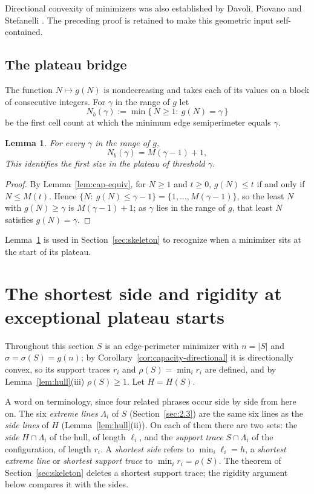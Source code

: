\documentclass[11pt]{article}
\theoremstyle{plain}
\newtheorem{lemma}[theorem]{Lemma}
\theoremstyle{definition}
\theoremstyle{remark}
\begin{document}
Directional convexity of minimizers was also established by
Davoli, Piovano and Stefanelli
\cite[Definition~3.2 and Proposition~3.3]{DavoliPiovanoStefanelli2017}.
The preceding proof is retained to make this geometric input
self-contained.

\subsection{The plateau bridge}\label{sec:2.7}

The function \(N\mapsto g(N)\) is nondecreasing and takes each of its values on a block of
consecutive integers. For \(\gamma\) in the range of \(g\) let
\[
   N_{b}(\gamma):=\min\{\,N\ge1:\ g(N)=\gamma\,\}
\]
be the first cell count at which the minimum edge semiperimeter equals \(\gamma\).

\begin{lemma}\label{lem:bridge}
For every \(\gamma\) in the range of \(g\),
\begin{equation}\label{eq:bridge}
   N_{b}(\gamma)=M(\gamma-1)+1 ,
\end{equation}
This identifies the first size in the plateau of threshold \(\gamma\).
\end{lemma}

\begin{proof}
By Lemma~\ref{lem:cap-equiv}, for \(N\ge1\) and \(t\ge0\), \(g(N)\le t\) if and only if \(N\le M(t)\). Hence
\(\{N:\ g(N)\le\gamma-1\}=\{1,\dots,M(\gamma-1)\}\), so the least \(N\) with
\(g(N)\ge\gamma\) is \(M(\gamma-1)+1\); as \(\gamma\) lies in the range of \(g\), that
least \(N\) satisfies \(g(N)=\gamma\).
\end{proof}

Lemma~\ref{lem:bridge} is used in Section~\ref{sec:skeleton} to recognize when a
minimizer sits at the start of its plateau.


\section{The shortest side and rigidity at exceptional plateau starts}\label{sec:rigidity}

Throughout this section \(S\) is an edge-perimeter minimizer with \(n=|S|\) and
\(\sigma=\sigma(S)=g(n)\); by Corollary~\ref{cor:capacity-directional} it is directionally convex, so
its support traces \(r_{i}\) and \(\rho(S)=\min_{i}r_{i}\) are defined, and by
Lemma~\ref{lem:hull}(iii) \(\rho(S)\ge1\). Let \(H=H(S)\).

A word on terminology, since four related phrases occur side by side from here on. The
six \emph{extreme lines} \(\Lambda_{i}\) of \(S\) (Section~\ref{sec:2.3}) are the same six
lines as the \emph{side lines} of \(H\) (Lemma~\ref{lem:hull}(ii)). On each of them there
are two sets: the \emph{side} \(H\cap\Lambda_{i}\) of the hull, of length \(\ell_{i}\), and the
\emph{support trace} \(S\cap\Lambda_{i}\) of the configuration, of length \(r_{i}\). A
\emph{shortest side} refers to \(\min_{i}\ell_{i}=h\), a \emph{shortest extreme line} or
\emph{shortest support trace} to \(\min_{i}r_{i}=\rho(S)\). The theorem of
Section~\ref{sec:skeleton} deletes a shortest support trace; the rigidity argument below
compares it with the sides.
\end{document}
